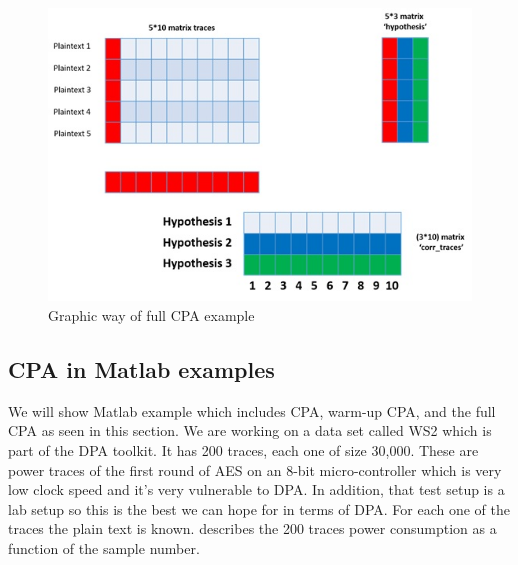 \begin{figure}[!ht]
    \centering
    \includegraphics[width=1.0\textwidth]{images/chapter8/cpa_example.jpg}
    \caption{Graphic way of full CPA example} \label{c8_cpa_example:fig}
\end{figure}

\subsection{CPA in Matlab examples}\label{c6_Matlab_CPA_example:subsec}

We will show Matlab example which includes CPA, warm-up CPA, and the full CPA as seen in this section.
We are working on a data set called WS2 which is part of the DPA toolkit. It has 200 traces, each one of size 30,000. These are power traces of the first round of AES on an 8-bit micro-controller which is very low clock speed and it's very vulnerable to DPA. In addition, that test setup is a lab setup so this is the best we can hope for in terms of DPA. For each one of the traces the plain text is known. 
 describes the 200 traces power consumption as a function of the sample number. 

